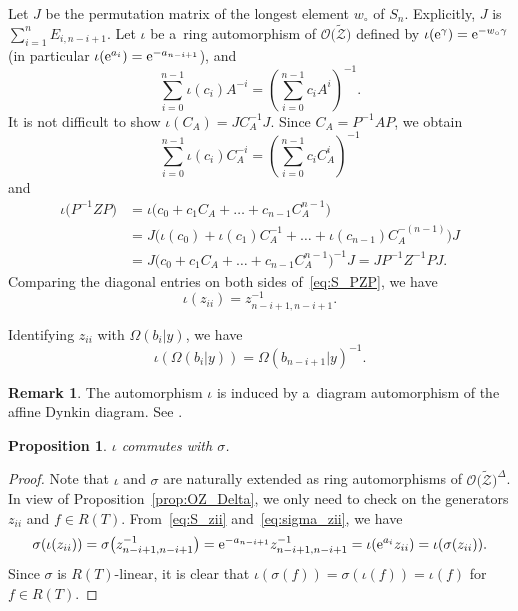 \documentclass[pdftex]{sigma}
\numberwithin{equation}{section}
\newtheorem{Proposition}[Theorem]{Proposition}
\theoremstyle{definition}
\newtheorem{Remark}[Theorem]{Remark}
\begin{document}
Let $J$ be the permutation matrix
of the longest element $w_\circ$ of $S_n$.
Explicitly, $J$ is $\sum_{i=1}^n E_{i,n-i+1}$.
Let $\iota$ be a~ring automorphism of $\mathscr{O}\bigl(\tilde{\mathscr{Z}}\bigr)$ defined by
$\iota({\rm e}^\gamma)=
{\rm e}^{-w_\circ \gamma}$ (in particular
$\iota({\rm e}^{a_i})={\rm e}^{-a_{n-i+1}}$), and
\[%
\sum_{i=0}^{n-1}
\iota(c_i)A^{-i}
=\left(\sum_{i=0}^{n-1}
c_iA^{i}\right)^{-1}.
\]
It is not difficult to show $\iota(C_A)=JC_A^{-1}J$.
Since $C_A=P^{-1}AP$, we obtain
\[\sum_{i=0}^{n-1}
\iota(c_i)C_A^{-i}
=\left(\sum_{i=0}^{n-1}
c_iC_A^{i}\right)^{-1}
\] and
\begin{align}
\iota\bigl(P^{-1}ZP\bigr)
&=\iota\bigl(c_0+c_1C_A+\dots+c_{n-1}C_A^{n-1}\bigr) \nonumber\\
&=J\bigl(\iota(c_0)+\iota(c_1)C_A^{-1}+\dots+\iota(c_{n-1})C_A^{-(n-1)} \bigr)J\nonumber\\
&=J\bigl(c_0+c_1C_A+\dots+c_{n-1}C_A^{n-1} \bigr)^{-1}J=JP^{-1}Z^{-1}PJ.\label{eq:S_PZP}
\end{align}
Comparing the diagonal entries on both sides of~\eqref{eq:S_PZP}, we have
\begin{equation}
\label{eq:S_zii}
\iota(z_{ii})=z_{n-i+1,n-i+1}^{-1}.
\end{equation}

Identifying $z_{ii}$ with $\Omega(b_i|y)$, we have
\begin{equation}\label{eq:iota Omega}
\iota(\Omega(b_i|y))=\Omega(b_{n-i+1}|y)^{-1}.
\end{equation}


\begin{Remark}
The automorphism $\iota$ is induced by a~diagram automorphism of the affine Dynkin diagram. See \cite[Sections~2.7 and~3.3]{ISY}.
\end{Remark}

\begin{Proposition}\label{prop:S_and_sigma}
$\iota$ commutes with $\sigma$.
\end{Proposition}
\begin{proof}
Note that $\iota$ and $\sigma$ are naturally extended
as ring automorphisms
of $\mathscr{O}\bigl(\tilde{\mathscr{Z}}\bigr)^\Delta$. In view of
Proposition~\ref{prop:OZ_Delta}, we only need to check on the generators $z_{ii}$
and $f\in R(T)$.
From~\eqref{eq:S_zii} and~\eqref{eq:sigma_zii}, we have
\begin{align*}
 \sigma (\iota(z_{ii}))
 =\sigma\bigl(z_{n-i+1,n-i+1}^{-1}\bigr)=
 {\rm e}^{-a_{n-i+1}}
 z_{n-i+1,n-i+1}^{-1}=\iota({\rm e}^{a_i}z_{ii})=\iota(\sigma(z_{ii})).
\end{align*}
Since $\sigma$ is $R(T)$-linear, it is clear that
$\iota(\sigma(f))=\sigma(\iota(f))=\iota(f)
$ for $f\in R(T)$.
\end{proof}
\end{document}
